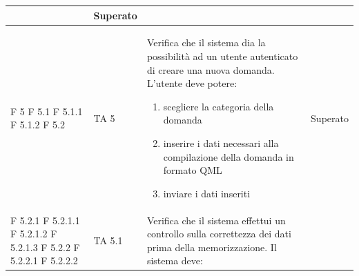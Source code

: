 \documentclass[a4paper,11pt]{article}
\begin{document}
\begin{longtable}{p{}p{}p{}p{}}
\begin{enumerate}
\end{enumerate} & Superato\\
\midrule
F 5 \newline F 5.1 \newline F 5.1.1 \newline F 5.1.2 \newline F 5.2& TA 5&Verifica che il sistema dia la possibilità ad un utente autenticato di creare una nuova domanda. \newline
L'utente deve potere:
\begin{enumerate}
\item scegliere la categoria della domanda
\item inserire i dati necessari alla compilazione della domanda in formato QML
\item inviare i dati inseriti 
\end{enumerate} & Superato\\
\midrule
F 5.2.1 \newline F 5.2.1.1 \newline F 5.2.1.2 \newline F 5.2.1.3 \newline F 5.2.2 \newline F 5.2.2.1 \newline F 5.2.2.2 \newline & TA 5.1&Verifica che il sistema effettui un controllo sulla correttezza dei dati prima della memorizzazione. Il sistema deve: 

\end{longtable}
\end{document}
